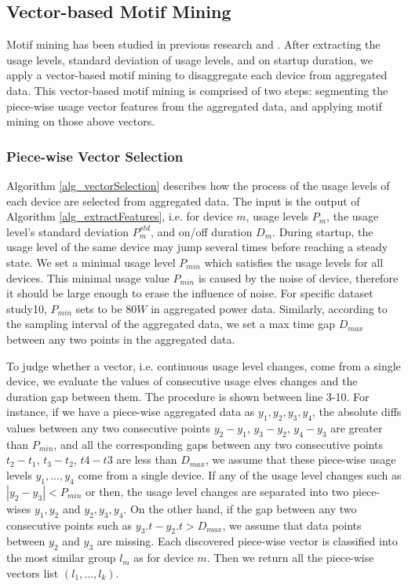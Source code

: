 \subsection{Vector-based Motif Mining}
Motif mining has been studied in previous research \cite{motif1} and \cite{motif2}. 
After extracting the usage levels, standard deviation of usage levels,
and on startup duration, 
we apply a vector-based motif mining to 
disaggregate each device from aggregated data. 
This vector-based motif mining is comprised of two steps:  
segmenting the piece-wise usage vector features from 
the aggregated data, 
and applying motif mining on those above vectors. 

\subsubsection{Piece-wise Vector Selection}
Algorithm \ref{alg_vectorSelection} describes how the process of 
the usage levels of each device are selected from aggregated data. 
The input is the output of Algorithm \ref{alg_extractFeatures}, 
i.e. for device $m$, usage levels $P_m$,  
the usage level's standard deviation $P_m^{std}$, 
and on/off duration $D_m$. 
During startup, the usage level of the same device may jump several times before 
reaching a steady state. 
We set a minimal usage level $P_{min}$ which satisfies the usage levels for all devices.  
This minimal usage value $P_{min}$ is caused by the noise of device, 
therefore it should be large enough to erase the influence of noise. 
For specific dataset study10, $P_{min}$ sets to be $80W$ in aggregated power data. 
Similarly, according to the sampling interval of the aggregated data, 
we set a max time gap $D_{max}$ between any two points in the aggregated data. 

To judge whether a vector, i.e. continuous usage level changes, 
come from a single device, 
we evaluate the values of consecutive usage elves changes and the duration gap between them. 
The procedure is shown between line 3-10.
For instance, if we have a piece-wise aggregated data as $y_1, y_2, y_3, y_4$, 
the absolute diffs values between any two consecutive points 
$y_2-y_1$, $y_3-y_2$, $y_4-y_3$ are greater than $P_{min}$, 
and all the corresponding gaps between any two consecutive points $t_2-t_1$, $t_3-t_2$, $t4-t3$ 
are less than $D_{max}$, 
we assume that these piece-wise usage levels $y_1,..., y_4$ come 
from a single device. 
If any of the usage level changes such as $|y_2 - y_3| < P_{min}$ or 
then, the usage level changes are separated into 
two piece-wises $y_1, y_2$ and $y_2, y_3, y_4$. 
On the other hand, 
if the gap between any two consecutive points such as $y_3.{t}-y_2.{t} > D_{max}$, 
we assume that data points between $y_2$ and $y_3$ are missing.
Each discovered piece-wise vector is classified into the most similar group $l_m$ as 
for device $m$. 
Then we return all the piece-wise vectors list $(l_1,...,l_k)$.

